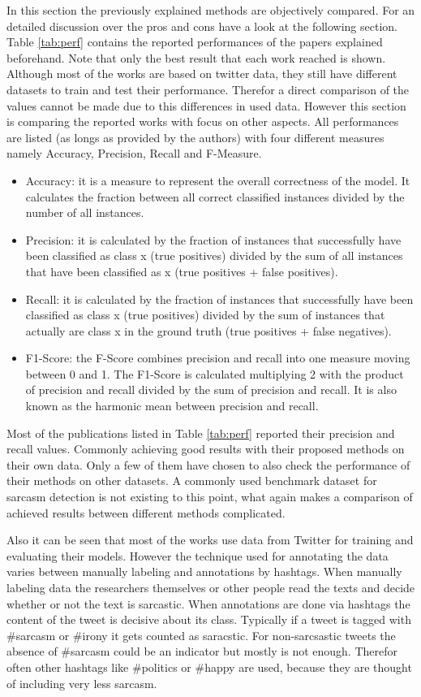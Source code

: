 \documentclass[sigconf,  review=false, nonacm=true]{acmart}
\begin{document}
In this section the previously explained methods are objectively compared. For an detailed discussion over the pros and cons have a look at the following section. Table \ref{tab:perf} contains the reported performances of the papers explained beforehand. Note that only the best result that each work reached is shown. Although most of the works are based on twitter data, they still have different datasets to train and test their performance. Therefor a direct comparison of the values cannot be made due to this differences in used data. However this section is comparing the reported works with focus on other aspects.
All performances are listed (as longs as provided by the authors) with four different measures namely Accuracy, Precision, Recall and F-Measure.

\begin{itemize} 
	\item Accuracy: it is a measure to represent the overall correctness of the model. It calculates the fraction between all correct classified instances divided by the number of all instances.
	\item Precision: it is calculated by the fraction of instances that successfully have been classified as class x (true positives) divided by the sum of all instances that have been classified as x (true positives + false positives).
	\item Recall: it is calculated by the fraction of instances that successfully have been classified as class x (true positives) divided by the sum of instances that actually are class x in the ground truth (true positives + false negatives).
	\item F1-Score: the F-Score combines precision and recall into one measure moving between 0 and 1. The F1-Score is calculated multiplying 2 with the product of precision and recall divided by the sum of precision and recall. It is also known as the harmonic mean between precision and recall.
\end{itemize}

Most of the publications listed in Table \ref{tab:perf} reported their precision and recall values. Commonly achieving good results with their proposed methods on their own data. Only a few of them have chosen to also check the performance of their methods on other datasets. A commonly used benchmark dataset for sarcasm detection is not existing to this point, what again makes a comparison of achieved results between different methods complicated.

Also it can be seen that most of the works use data from Twitter for training and evaluating their models. However the technique used for annotating the data varies between manually labeling and annotations by hashtags. When manually labeling data the researchers themselves or other people read the texts and decide whether or not the text is sarcastic. When annotations are done via hashtags the content of the tweet is decisive about its class. Typically if a tweet is tagged with \#sarcasm or \#irony it gets counted as saracstic. For non-sarcsastic tweets the absence of \#sarcasm could be an indicator but mostly is not enough. Therefor often other hashtags like \#politics or \#happy are used, because they are thought of including very less sarcasm.
 
\end{document}
